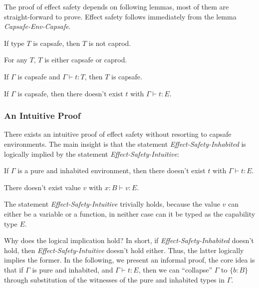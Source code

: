 The proof of effect safety depends on following lemmas, most of them
are straight-forward to prove. Effect safety follows immediately from
the lemma \emph{Capsafe-Env-Capsafe}.


\begin{lemma}
 If type $T$ is capsafe, then $T$ is not caprod.
\end{lemma}

\begin{lemma}
 For any $T$, $T$ is either capsafe or caprod.
\end{lemma}

\begin{lemma}
  If $\Gamma$ is capsafe and $\Gamma \vdash t : T$, then $T$ is capsafe.
\end{lemma}

\begin{theorem}
  If $\Gamma$ is capsafe, then there doesn't exist $t$ with
  $\Gamma \vdash t : E$.
\end{theorem}

\subsubsection{An Intuitive Proof}

There exists an intuitive proof of effect safety without resorting to
capsafe environments. The main insight is that the statement
\emph{Effect-Safety-Inhabited} is logically implied by the
statement \emph{Effect-Safety-Intuitive}:

\begin{definition}
  If $\Gamma$ is a pure and inhabited environment, then there doesn't
  exist $t$ with $\Gamma \vdash t : E$.
\end{definition}

\begin{definition}
  There doesn't exist value $v$ with $x:B \vdash v : E$.
\end{definition}

The statement \emph{Effect-Safety-Intuitive} trivially holds, because
the value $v$ can either be a variable or a function, in neither case
can it be typed as the capability type $E$.

Why does the logical implication hold? In short, if
\emph{Effect-Safety-Inhabited} doesn't hold, then
\emph{Effect-Safety-Intuitive} doesn't hold either. Thus, the latter
logically implies the former.  In the following, we present an
informal proof, the core idea is that if $\Gamma$ is pure and
inhabited, and $\Gamma \vdash t : E$, then we can ``collapse''
$\Gamma$ to $\{b : B\}$ through substitution of the witnesses of the
pure and inhabited types in $\Gamma$.

